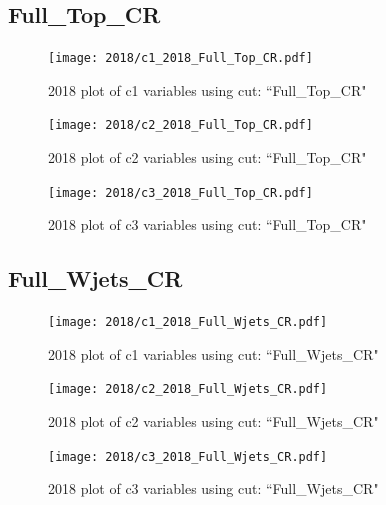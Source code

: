 \documentclass{article}
\begin{document}
      \subsection*{Full\_Top\_CR}
                        \begin{figure}[H]
                            \centering
                            \caption{2018 plot of c1 variables using cut: ``Full\_Top\_CR"}
                            \texttt{[image: 2018/c1\_2018\_Full\_Top\_CR.pdf]}
                        \end{figure}    
                        \begin{figure}[H]
                            \centering
                            \caption{2018 plot of c2 variables using cut: ``Full\_Top\_CR"}
                            \texttt{[image: 2018/c2\_2018\_Full\_Top\_CR.pdf]}
                        \end{figure}    
                        \begin{figure}[H]
                            \centering
                            \caption{2018 plot of c3 variables using cut: ``Full\_Top\_CR"}
                            \texttt{[image: 2018/c3\_2018\_Full\_Top\_CR.pdf]}
                        \end{figure}    
      \subsection*{Full\_Wjets\_CR}
                        \begin{figure}[H]
                            \centering
                            \caption{2018 plot of c1 variables using cut: ``Full\_Wjets\_CR"}
                            \texttt{[image: 2018/c1\_2018\_Full\_Wjets\_CR.pdf]}
                        \end{figure}    
                        \begin{figure}[H]
                            \centering
                            \caption{2018 plot of c2 variables using cut: ``Full\_Wjets\_CR"}
                            \texttt{[image: 2018/c2\_2018\_Full\_Wjets\_CR.pdf]}
                        \end{figure}    
                        \begin{figure}[H]
                            \centering
                            \caption{2018 plot of c3 variables using cut: ``Full\_Wjets\_CR"}
                            \texttt{[image: 2018/c3\_2018\_Full\_Wjets\_CR.pdf]}
                        \end{figure}    
\end{document}
